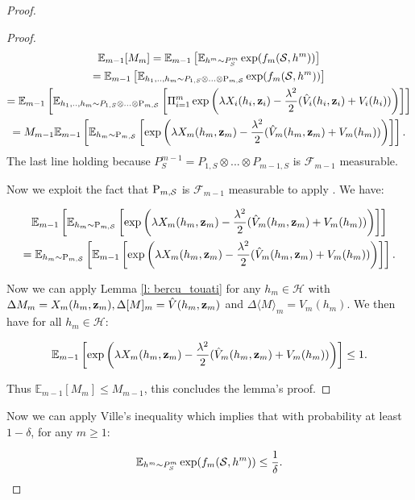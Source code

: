 \begin{proof}
\begin{proof}
     \begin{multline*}
       \mathbb{E}_{m-1}[M_m] =\mathbb{E}_{m-1}\left[\mathbb{E}_{h^m\sim P^m_S}\exp(f_m(\S,h^m))\right] \\
        = \mathbb{E}_{m-1}\left[\mathbb{E}_{h_1,..,h_m\sim P_{1,S}\otimes...\otimes \P_{m,\S}}\exp(f_m(\S,h^m))\right] \\
        = \mathbb{E}_{m-1}\left[\mathbb{E}_{h_1,..,h_m\sim P_{1,S}\otimes...\otimes \P_{m,\S}}\left[\Pi_{i=1}^m\exp\left(\lambda X_i(h_i,\z_i)  - \frac{\lambda^2}{2}(\hat{V}_i(h_i,\z_i) + V_i(h_i))\right)\right] \right] \\
         = M_{m-1} \mathbb{E}_{m-1}\left[ \mathbb{E}_{h_m\sim \P_{m,\S}}\left[\exp\left(\lambda X_m(h_m,\z_m)  - \frac{\lambda^2}{2}(\hat{V}_m(h_m,\z_m) + V_m(h_m))\right) \right]\right].
     \end{multline*}
 The last line holding because $P^{m-1}_S = P_{1,S}\otimes...\otimes P_{m-1,S}$ is $\mathcal{F}_{m-1}$ measurable.


   Now we exploit the fact that $\P_{m,\S}$ is $\mathcal{F}_{m-1}$ measurable to apply . We have:

   \begin{multline*}
     \mathbb{E}_{m-1}\left[ \mathbb{E}_{h_m\sim \P_{m,\S}}\left[\exp\left(\lambda X_m(h_m,\z_m)  - \frac{\lambda^2}{2}(\hat{V}_m(h_m,\z_m) + V_m(h_m))\right) \right]\right] \\ =  \mathbb{E}_{h_m\sim \P_{m,\S}}\left[\mathbb{E}_{m-1}\left[\exp\left(\lambda X_m(h_m,\z_m)  - \frac{\lambda^2}{2}(\hat{V}_m(h_m,\z_m) + V_m(h_m))\right) \right]\right].
   \end{multline*}

 Now we can apply Lemma \ref{l: bercu_touati} for any $h_m\in\mathcal{H}$ with $\Delta M_{m}=X_m(h_m,\z_m), \Delta[M]_{m}=\hat{V}(h_m,\z_m)$ and $\Delta\langle M\rangle_{m}= V_m(h_m)$. We then have for all $h_m\in\mathcal{H}$:

 \[ \mathbb{E}_{m-1}\left[\exp\left(\lambda X_m(h_m,\z_m)  - \frac{\lambda^2}{2}(\hat{V}_m(h_m,\z_m) + V_m(h_m))\right) \right] \leq 1.  \]

 Thus $\mathbb{E}_{m-1}[M_m] \leq M_{m-1}$, this concludes the lemma's proof.
   \end{proof}

 Now we can apply Ville's inequality which implies that with probability at least $1-\delta$, for any $m\geq 1$:

 \[ \mathbb{E}_{h^m\sim P^m_S}\exp(f_m(\S,h^m)) \leq \frac{1}{\delta}. \]


\end{proof}
